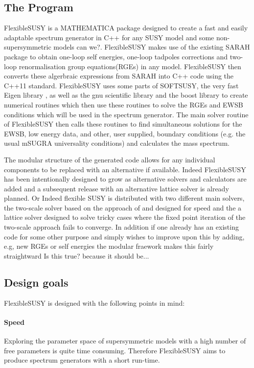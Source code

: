 \documentclass[final,3p,times,pdflatex]{elsarticle}
\newcommand{\sarah}{SARAH\xspace}
\newcommand{\fs}{FlexibleSUSY\xspace}
\begin{document}
\subsection{The Program}
\fs is a MATHEMATICA package designed to create a fast and easily
adaptable spectrum generator in C++ for any SUSY model and some
non-supersymmetric models {\color{red} can we?}.  \fs makes use of the
existing \sarah package \cite{Staub:2010ty,Staub:2009bi,Staub:2010jh,Staub:2012pb,Staub:2013tta} to obtain one-loop self energies, one-loop
tadpoles corrections and two-loop renormalisation group
equations(RGEs) in any model.  \fs then converts these algerbraic
expressions from \sarah into C++ code using the C++11 standard. \fs
uses some parts of SOFTSUSY\cite{Allanach:2001kg}, the very fast Eigen
library \cite{eigen}, as well as the gnu scientific library and the
boost library to create numerical routines which then use these
routines to solve the RGEs and EWSB conditions which will be used in
the spectrum generator. The main solver routine of \fs then calls
these routines to find simultaneous solutions for the EWSB, low energy
data, and other, user supplied, boundary conditions (e.g. the usual
mSUGRA universality conditions) and calculates the mass spectrum.

 The modular structure of the generated code allows for any individual
 components to be replaced with an alternative if available.  Indeed
 \fs has been intentionally designed to grow as alternative solvers
 and calculators are added and a subsequent release with an
 alternative lattice solver is already planned.{\color{red} Or Indeed
   flexible SUSY is distributed with two different main solvers, the
   two-scale solver based on the approach of \cite{} and designed for
   speed and the a lattice solver designed to solve tricky cases where
   the fixed point iteration of the two-scale approach fails to
   converge.}  In addition if one already has an existing code for
 some other purpose and simply wishes to improve upon this by adding,
 e.g, new RGEs or self energies the modular fraework makes this fairly
 straightward{\color{red} Is this true?  because it should be...}


\subsection{Design goals}

FlexibleSUSY is designed with the following points in mind:

\paragraph{Speed}
Exploring the parameter space of supersymmetric models with a high
number of free parameters is quite time consuming.  Therefore
FlexibleSUSY aims to produce spectrum generators with a short run-time.
\end{document}
